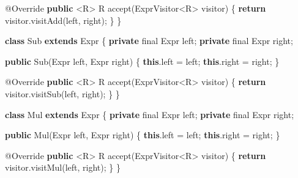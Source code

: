 \documentclass[]{article}
\newenvironment{Shaded}{}{}
\newcommand{\AttributeTok}[1]{\textcolor[rgb]{0.49,0.56,0.16}{#1}}
\newcommand{\ControlFlowTok}[1]{\textcolor[rgb]{0.00,0.44,0.13}{\textbf{#1}}}
\newcommand{\DataTypeTok}[1]{\textcolor[rgb]{0.56,0.13,0.00}{#1}}
\newcommand{\FunctionTok}[1]{\textcolor[rgb]{0.02,0.16,0.49}{#1}}
\newcommand{\KeywordTok}[1]{\textcolor[rgb]{0.00,0.44,0.13}{\textbf{#1}}}
\newcommand{\NormalTok}[1]{#1}
\newcommand{\OperatorTok}[1]{\textcolor[rgb]{0.40,0.40,0.40}{#1}}
\begin{document}
\begin{Shaded}
\begin{Highlighting}[]
    \AttributeTok{@Override}
    \KeywordTok{public} \OperatorTok{\textless{}}\NormalTok{R}\OperatorTok{\textgreater{}}\NormalTok{ R }\FunctionTok{accept}\OperatorTok{(}\NormalTok{ExprVisitor}\OperatorTok{\textless{}}\NormalTok{R}\OperatorTok{\textgreater{}}\NormalTok{ visitor}\OperatorTok{)} \OperatorTok{\{}
        \ControlFlowTok{return}\NormalTok{ visitor}\OperatorTok{.}\FunctionTok{visitAdd}\OperatorTok{(}\NormalTok{left}\OperatorTok{,}\NormalTok{ right}\OperatorTok{);}
    \OperatorTok{\}}
\OperatorTok{\}}

\KeywordTok{class}\NormalTok{ Sub }\KeywordTok{extends}\NormalTok{ Expr }\OperatorTok{\{}
    \KeywordTok{private} \DataTypeTok{final}\NormalTok{ Expr left}\OperatorTok{;}
    \KeywordTok{private} \DataTypeTok{final}\NormalTok{ Expr right}\OperatorTok{;}

    \KeywordTok{public} \FunctionTok{Sub}\OperatorTok{(}\NormalTok{Expr left}\OperatorTok{,}\NormalTok{ Expr right}\OperatorTok{)} \OperatorTok{\{}
        \KeywordTok{this}\OperatorTok{.}\FunctionTok{left} \OperatorTok{=}\NormalTok{ left}\OperatorTok{;}
        \KeywordTok{this}\OperatorTok{.}\FunctionTok{right} \OperatorTok{=}\NormalTok{ right}\OperatorTok{;}
    \OperatorTok{\}}

    \AttributeTok{@Override}
    \KeywordTok{public} \OperatorTok{\textless{}}\NormalTok{R}\OperatorTok{\textgreater{}}\NormalTok{ R }\FunctionTok{accept}\OperatorTok{(}\NormalTok{ExprVisitor}\OperatorTok{\textless{}}\NormalTok{R}\OperatorTok{\textgreater{}}\NormalTok{ visitor}\OperatorTok{)} \OperatorTok{\{}
        \ControlFlowTok{return}\NormalTok{ visitor}\OperatorTok{.}\FunctionTok{visitSub}\OperatorTok{(}\NormalTok{left}\OperatorTok{,}\NormalTok{ right}\OperatorTok{);}
    \OperatorTok{\}}
\OperatorTok{\}}

\KeywordTok{class}\NormalTok{ Mul }\KeywordTok{extends}\NormalTok{ Expr }\OperatorTok{\{}
    \KeywordTok{private} \DataTypeTok{final}\NormalTok{ Expr left}\OperatorTok{;}
    \KeywordTok{private} \DataTypeTok{final}\NormalTok{ Expr right}\OperatorTok{;}

    \KeywordTok{public} \FunctionTok{Mul}\OperatorTok{(}\NormalTok{Expr left}\OperatorTok{,}\NormalTok{ Expr right}\OperatorTok{)} \OperatorTok{\{}
        \KeywordTok{this}\OperatorTok{.}\FunctionTok{left} \OperatorTok{=}\NormalTok{ left}\OperatorTok{;}
        \KeywordTok{this}\OperatorTok{.}\FunctionTok{right} \OperatorTok{=}\NormalTok{ right}\OperatorTok{;}
    \OperatorTok{\}}

    \AttributeTok{@Override}
    \KeywordTok{public} \OperatorTok{\textless{}}\NormalTok{R}\OperatorTok{\textgreater{}}\NormalTok{ R }\FunctionTok{accept}\OperatorTok{(}\NormalTok{ExprVisitor}\OperatorTok{\textless{}}\NormalTok{R}\OperatorTok{\textgreater{}}\NormalTok{ visitor}\OperatorTok{)} \OperatorTok{\{}
        \ControlFlowTok{return}\NormalTok{ visitor}\OperatorTok{.}\FunctionTok{visitMul}\OperatorTok{(}\NormalTok{left}\OperatorTok{,}\NormalTok{ right}\OperatorTok{);}
    \OperatorTok{\}}
\OperatorTok{\}}
\end{Highlighting}
\end{Shaded}
\end{document}
